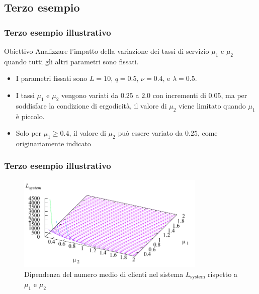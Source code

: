 \documentclass{beamer}
\begin{document}
\subsection{Terzo esempio}


\begin{frame}
    \frametitle{Terzo esempio illustrativo}
    \begin{block}{Obiettivo}
        Analizzare l'impatto della variazione dei tassi di servizio $\mu_1$ e $\mu_2$ quando tutti gli altri parametri sono fissati.
    \end{block}
    \begin{itemize}
        \item I parametri fissati sono $L=10$, $q=0.5$, $\nu=0.4$, e $\lambda=0.5$.
        \item I tassi $\mu_1$ e $\mu_2$ vengono variati da $0.25$ a $2.0$ con incrementi di $0.05$, ma per soddisfare la condizione di ergodicità, il valore di $\mu_2$ viene limitato quando $\mu_1$ è piccolo.
        \item Solo per $\mu_1\geq0.4$, il valore di $\mu_2$ può essere variato da $0.25$, come originariamente indicato
    \end{itemize}
\end{frame}


\begin{frame}
    \frametitle{Terzo esempio illustrativo}
    \begin{figure}[h]
        \centering
        \includegraphics[width=0.8\textwidth]{9LBRzWR.png}
        \caption{Dipendenza del numero medio di clienti nel sistema $L_{\mathrm{system}}$ rispetto a $\mu_1$ e $\mu_2$}
    \end{figure}
\end{frame}
\end{document}
